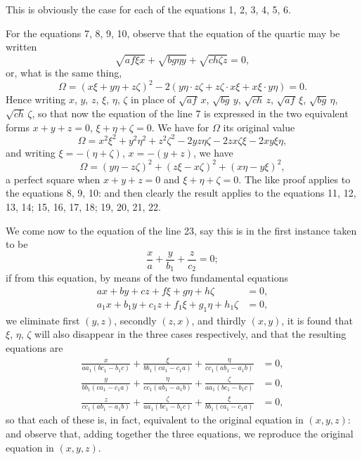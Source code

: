 \documentclass[11pt,a4paper]{book}
\begin{document}
This is obviously the case for each of the equations 1, 2, 3, 4, 5, 6.

For the equations 7, 8, 9, 10, observe that the equation of the quartic may be written
\[
\sqrt{af\xi x} + \sqrt{bg\eta y} + \sqrt{ch\zeta z} = 0,
\]
or, what is the same thing,
\[
\Omega = (x\xi + y\eta + z\zeta)^2 - 2(y\eta\cdot z\zeta + z\zeta\cdot x\xi + x\xi\cdot y\eta) = 0.
\]
Hence writing $x$, $y$, $z$, $\xi$, $\eta$, $\zeta$ in place of $\sqrt{af}\,x$, $\sqrt{bg}\,y$, $\sqrt{ch}\,z$, $\sqrt{af}\,\xi$, $\sqrt{bg}\,\eta$, $\sqrt{ch}\,\zeta$, so that now the equation of the line 7 is expressed in the two equivalent forms $x + y + z = 0$, $\xi + \eta + \zeta = 0$. We have for $\Omega$ its original value
\[
\Omega = x^2\xi^2 + y^2\eta^2 + z^2\zeta^2 - 2yz\eta\zeta - 2zx\zeta\xi - 2xy\xi\eta,
\]
and writing $\xi = -(\eta + \zeta)$, $x = -(y+z)$, we have
\[
\Omega = (y\eta - z\zeta)^2 + (z\xi - x\zeta)^2 + (x\eta - y\xi)^2,
\]
a perfect square when $x + y + z = 0$ and $\xi + \eta + \zeta = 0$. The like proof applies to the equations 8, 9, 10: and then clearly the result applies to the equations 11, 12, 13, 14; 15, 16, 17, 18; 19, 20, 21, 22.

We come now to the equation of the line 23, say this is in the first instance taken to be
\[
\frac{x}{a} + \frac{y}{b_1} + \frac{z}{c_2} = 0;
\]
if from this equation, by means of the two fundamental equations
\begin{align*}
ax + by + cz + f\xi + g\eta + h\zeta &= 0,\\
a_1x + b_1y + c_1z + f_1\xi + g_1\eta + h_1\zeta &= 0,
\end{align*}
we eliminate first $(y,z)$, secondly $(z,x)$, and thirdly $(x,y)$, it is found that $\xi$, $\eta$, $\zeta$ will also disappear in the three cases respectively, and that the resulting equations are
\begin{align*}
\frac{x}{aa_1(bc_1-b_1c)} + \frac{\xi}{bb_1(ca_1-c_1a)} + \frac{\eta}{cc_1(ab_1-a_1b)} &= 0,\\
\frac{y}{bb_1(ca_1-c_1a)} + \frac{\eta}{cc_1(ab_1-a_1b)} + \frac{\zeta}{aa_1(bc_1-b_1c)} &= 0,\\
\frac{z}{cc_1(ab_1-a_1b)} + \frac{\zeta}{aa_1(bc_1-b_1c)} + \frac{\xi}{bb_1(ca_1-c_1a)} &= 0,
\end{align*}
so that each of these is, in fact, equivalent to the original equation in $(x,y,z)$: and observe that, adding together the three equations, we reproduce the original equation in $(x,y,z)$.
\end{document}
